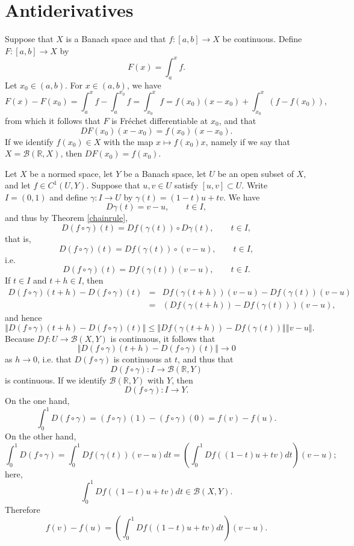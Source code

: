 \documentclass{article}
\newcommand{\norm}[1]{\left\Vert #1 \right\Vert}
\theoremstyle{definition}
\begin{document}
\section{Antiderivatives}
Suppose that $X$ is a Banach space and that $f:[a,b] \to X$ be continuous. Define $F:[a,b] \to X$ by
\[
F(x)=\int_a^x f.
\]
Let $x_0 \in (a,b)$. For $x \in (a,b)$, we have
\[
F(x)-F(x_0)=\int_a^x f - \int_a^{x_0} f = \int_{x_0}^x f = f(x_0)(x-x_0)+\int_{x_0}^x (f-f(x_0)),
\]
from which it follows that $F$ is Fr\'echet differentiable at $x_0$, and that
\[
DF(x_0)(x-x_0)=f(x_0)(x-x_0).
\]
If we identify $f(x_0) \in X$ with the map $x \mapsto f(x_0)x$, namely if we say that $X=\mathscr{B}(\mathbb{R},X)$, then $DF(x_0)=f(x_0)$. 

Let $X$ be a normed space, let $Y$ be a Banach space,  let $U$ be an open subset of $X$, and let $f \in C^1(U,Y)$.
Suppose that $u,v \in U$ satisfy $[u,v] \subset U$. Write $I=(0,1)$ 
and define $\gamma:I \to U$ by $\gamma(t)=(1-t)u+tv$.
We have
\[
D\gamma(t)=v-u, \qquad t \in I,
\]
and thus by Theorem \ref{chainrule}, 
\[
D(f \circ \gamma)(t) = Df(\gamma(t)) \circ D\gamma(t), \qquad t \in I,
\]
that is,
\[
D(f \circ \gamma)(t) = Df(\gamma(t)) \circ (v-u), \qquad t \in I,
\]
i.e.
\[
D(f\circ \gamma)(t) = Df(\gamma(t))(v-u), \qquad t \in I.
\]
If $t \in I$ and $t+h \in I$, then
\begin{eqnarray*}
D(f\circ \gamma)(t+h)
-D(f\circ \gamma)(t) &=& Df(\gamma(t+h))(v-u)-
Df(\gamma(t))(v-u)\\
&=&\left(Df(\gamma(t+h))-Df(\gamma(t))\right)(v-u),
\end{eqnarray*}
and hence
\[
\norm{D(f\circ \gamma)(t+h)
-D(f\circ \gamma)(t)} \leq \norm{Df(\gamma(t+h))-Df(\gamma(t))} \norm{v-u}.
\]
Because $Df:U \to \mathscr{B}(X,Y)$ is continuous, it follows that 
\[
\norm{D(f\circ \gamma)(t+h)
-D(f\circ \gamma)(t)} \to 0
\]
as $h \to 0$, i.e. that $D(f \circ \gamma)$ is continuous at $t$, and thus that
\[
D(f \circ \gamma):I \to \mathscr{B}(\mathbb{R},Y)
\]
is continuous. If we identify $\mathscr{B}(\mathbb{R},Y)$ with $Y$, then
\[
D(f \circ \gamma):I \to Y.
\]
On the one hand,
\[
\int_0^1 D(f \circ \gamma) = (f \circ \gamma)(1)-(f \circ \gamma)(0)=f(v)-f(u).
\]
On the other hand,
\[
\int_0^1 D(f\circ \gamma) = \int_0^1 Df(\gamma(t))(v-u) dt = \left( \int_0^1 Df((1-t)u+tv) dt \right) (v-u);
\]
here,
\[
\int_0^1 Df((1-t)u+tv) dt  \in \mathscr{B}(X,Y).
\]
Therefore
\[
f(v)-f(u)=  \left( \int_0^1 Df((1-t)u+tv) dt \right) (v-u).
\]
\end{document}
